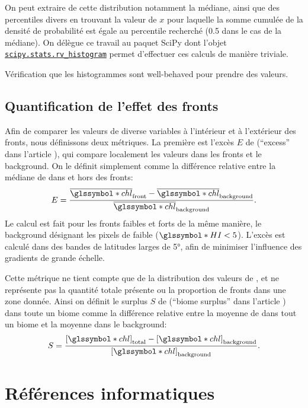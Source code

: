 \documentclass[index]{subfiles}
\begin{document}
On peut extraire de cette distribution notamment la médiane, ainsi que des percentiles divers en trouvant la valeur de \(x\) pour laquelle la somme cumulée de la densité de probabilité est égale au percentile recherché (0.5 dans le cas de la médiane).
On délègue ce travail au paquet SciPy dont l'objet \href{%
  docs.scipy.org/%
  doc/scipy/reference/generated/%
  scipy.stats.rv_histogram.html%
}{\texttt{scipy.stats.rv\_histogram}}
permet d'effectuer ces calculs de manière triviale.

Vérification que les histogrammes sont well-behaved pour prendre des valeurs.

\subsection{Quantification de l'effet des fronts}
\label{sec:extraction-surplus}

Afin de comparer les valeurs de diverse variables à l'intérieur et à l'extérieur des fronts, nous définissons deux métriques.
La première est l'excès \(E\) de  (\enquote{excess} dans l'article ), qui compare localement les valeurs dans les fronts et le background. On le définit simplement comme la différence relative entre la médiane de  dans et hors des fronts:
\begin{equation}
  E = \frac{\med{\am{chl}}_\frt - \med{\am{chl}}_\bkg}
  {\med{\am{chl}}_\bkg} .
\end{equation}
Le calcul est fait pour les fronts faibles et forts de la même manière, le background désignant les pixels de  faible (\(\am{HI} < 5\)).
L'excès est calculé dans des bandes de latitudes larges de \ang{5}, afin de minimiser l'influence des gradients de grande échelle.

Cette métrique ne tient compte que de la distribution des valeurs de , et ne représente pas la quantité totale présente ou la proportion de fronts dans une zone donnée.
Ainsi on définit le surplus \(S\) de  (\enquote{biome surplus} dans l'article ) dans toute un biome comme la différence relative entre la moyenne de  dans tout un biome et la moyenne dans le background:
\begin{equation}
  S = \frac{\moy{\am{chl}}_\tot - \moy{\am{chl}}_\bkg}
  {\moy{\am{chl}}_\bkg} .
\end{equation}

\section{Références informatiques}
\label{sec:ref-info}
\end{document}
